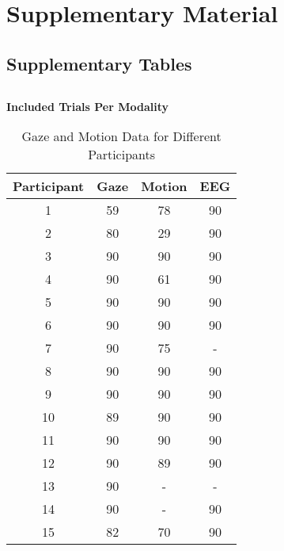 \documentclass[10pt]{article}
\begin{document}
\section*{Supplementary Material}

\captionsetup[table]{labelfont=bf,labelformat=simple,labelsep=space,name=Supplementary Table}
\captionsetup[figure]{labelfont=bf,labelformat=simple,labelsep=space,name=Supplementary Figure}

\subsection*{Supplementary Tables}

\subsection*{}
\textbf{Included Trials Per Modality}
\begin{table}[h]
    \centering
    \caption{Gaze and Motion Data for Different Participants}
    \begin{tabular}{cccc}
        \toprule
        \textbf{Participant} & \textbf{Gaze} & \textbf{Motion} & \textbf{EEG}\\
        \midrule
        1  & 59 & 78 & 90 \\
        \midrule
        2  & 80 & 29 & 90 \\
        \midrule
        3  & 90 & 90 & 90 \\
        \midrule
        4  & 90 & 61 & 90\\
        \midrule
        5  & 90 & 90 & 90 \\
        \midrule
        6  & 90 & 90 & 90\\
        \midrule
        7  & 90 & 75 & -\\
        \midrule
        8  & 90 & 90 & 90\\
        \midrule
        9  & 90 & 90 & 90\\
        \midrule
        10 & 89 & 90 & 90\\
        \midrule
        11 & 90 & 90 & 90\\
        \midrule
        12 & 90 & 89 & 90\\
        \midrule
        13 & 90 & - & -\\
        \midrule
        14 & 90 & - & 90\\
        \midrule
        15 & 82 & 70 & 90 \\
        \hline
    \end{tabular}
    \label{table:gaze_motion_eeg data}
\end{table}
\end{document}
